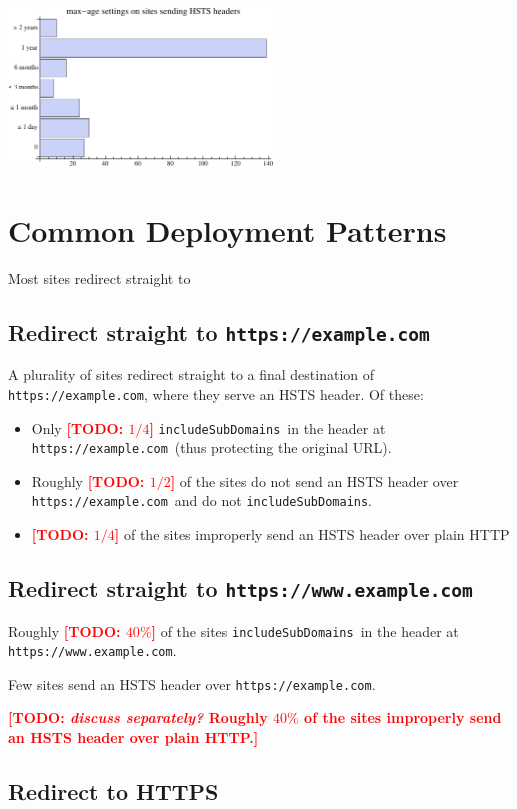\documentclass[conference]{./IEEEtran}
\newcommand{\todo}[1]{\textcolor{red}{\textbf{[TODO: #1]}}}
\newcommand{\td}[2]{\textcolor{red}{\textbf{[TODO: {\it{#1}} #2]}}}
\newcommand{\site}[1]{\texttt{#1}}
\newcommand{\code}[1]{\texttt{#1}}
\newcommand{\iSD}{{\code{includeSubDomains}}}
\newcommand{\genericsite}{example.com}
\newcommand{\s}{{\site{https://\genericsite}}}
\newcommand{\sw}{{\site{https://www.\genericsite}}}
\theoremstyle{plain}
\begin{document}
\begin{center}
\includegraphics[width=70mm]{max-age.pdf}
\end{center}
 

\section{Common Deployment Patterns}

Most sites redirect straight to 

\subsection{Redirect straight to \s}

A plurality of sites redirect straight to a final destination of \s, where they serve an HSTS header. Of these:

\begin{itemize}
\item Only \todo{$1/4$} \iSD~in the header at \s~(thus protecting the original URL).
\item Roughly \todo{$1/2$} of the sites do not send an HSTS header over \s~and do not \iSD.
\item \todo{$1/4$} of the sites improperly send an HSTS header over plain HTTP%
\end{itemize}

\subsection{Redirect straight to \sw}

\item Roughly \todo{$40\%$} of the sites \iSD~in the header at \sw.
\item Few sites send an HSTS header over \s.
\item \td{discuss separately?}{Roughly $40\%$ of the sites improperly send an HSTS header over plain HTTP.}

\subsection{Redirect to HTTPS}
\end{document}
